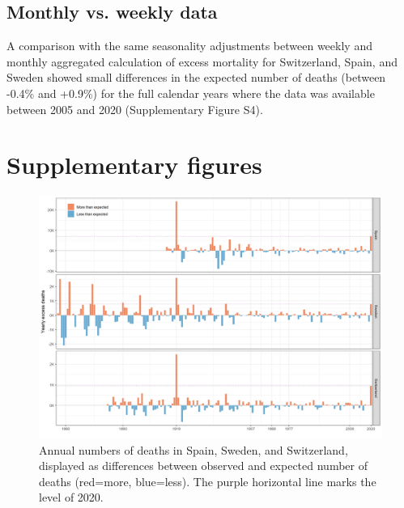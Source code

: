 \documentclass{article}
\begin{document}
	\subsection{Monthly vs. weekly data}
	
	A comparison with the same seasonality adjustments between weekly and monthly aggregated calculation of excess mortality for Switzerland, Spain, and Sweden showed small differences in the expected number of deaths (between -0.4\% and +0.9\%) for the full calendar years where the data was available between 2005 and 2020 (Supplementary Figure S4).	
	
	\section{Supplementary figures}
	
	\begin{figure}[H]
		\centering	
		\includegraphics[width=\linewidth]{../Figure_S1.png}
		\caption{Annual numbers of deaths in Spain, Sweden, and Switzerland, displayed as differences between observed and expected number of deaths (red=more, blue=less). The purple horizontal line marks the level of 2020.}
	\end{figure}
\end{document}
